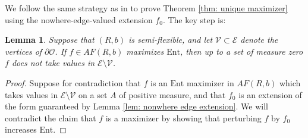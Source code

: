 \documentclass[11pt]{article}
\newtheorem{lemma}[thm]{Lemma}
\theoremstyle{remark}
\theoremstyle{definition}
\newcommand{\Ent}{\text{Ent}}
\newcommand{\mc}[1]{\mathcal{#1}}
\begin{document}
We follow the same strategy as in \cite[Proposition 7.10]{gorin2021lectures} to prove Theorem \ref{thm: unique maximizer} using the nowhere-edge-valued extension $f_0$. The key step is:

\begin{lemma}\label{lem: Gorin}
    Suppose that $(R,b)$ is semi-flexible, and let $\mc V\subset \mc E$ denote the vertices of $\partial \mc O$. If $f\in AF(R,b)$ maximizes $\Ent$, then up to a set of measure zero $f$ does not take values in $\mc E \setminus \mc V$.
\end{lemma}

\begin{proof}
    Suppose for contradiction that $f$ is an $\Ent$ maximizer in $AF(R,b)$ which takes values in $\mc E\setminus \mc V$ on a set $A$ of positive measure, and that $f_0$ is an extension of the form guaranteed by Lemma \ref{lem: nonwhere edge extension}. We will contradict the claim that $f$ is a maximizer by showing that perturbing $f$ by $f_0$ increases $\Ent$. 


\end{proof}
\end{document}
